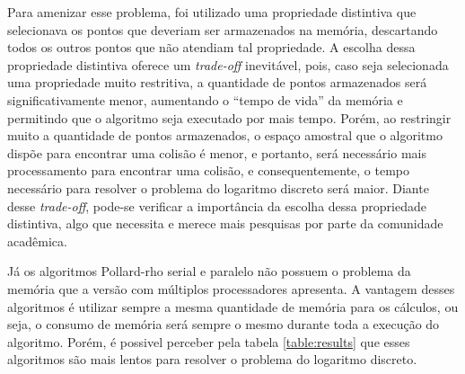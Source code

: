Para amenizar esse problema, foi utilizado uma propriedade distintiva que selecionava os pontos que deveriam ser armazenados na memória, descartando todos os outros pontos que não atendiam tal propriedade. A escolha dessa propriedade distintiva oferece um \textit{trade-off} inevitável, pois, caso seja selecionada uma propriedade muito restritiva, a quantidade de pontos armazenados será significativamente menor, aumentando o ``tempo de vida'' da memória e permitindo que o algoritmo seja executado por mais tempo. Porém, ao restringir muito a quantidade de pontos armazenados, o espaço amostral que o algoritmo dispõe para encontrar uma colisão é menor, e portanto, será necessário mais processamento para encontrar uma colisão, e consequentemente, o tempo necessário para resolver o problema do logaritmo discreto será maior. Diante desse \textit{trade-off}, pode-se verificar a importância da escolha dessa propriedade distintiva, algo que necessita e merece mais pesquisas por parte da comunidade acadêmica.

Já os algoritmos Pollard-rho serial e paralelo não possuem o problema da memória que a versão com múltiplos processadores apresenta. A vantagem desses algoritmos é utilizar sempre a mesma quantidade de memória para os cálculos, ou seja, o consumo de memória será sempre o mesmo durante toda a execução do algoritmo. Porém, é possivel perceber pela tabela \ref{table:results} que esses algoritmos são mais lentos para resolver o problema do logaritmo discreto.
